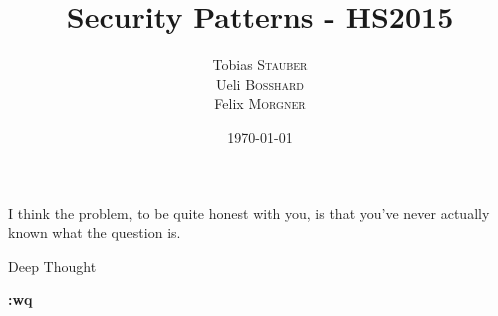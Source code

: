 \documentclass{report}
\title{Security Patterns - HS2015}
\author{Tobias \textsc{Stauber}\\Ueli \textsc{Bosshard}\\Felix \textsc{Morgner}}
\date{\today}
\newcommand{\inputChapter}[1]{}
\begin{document}
\maketitle
\clearpage
\vspace*{\fill}
  \epigraph{I think the problem, to be quite honest with you, is that you've never actually known what the question is.}{Deep Thought}
\vfill
\clearpage

\setcounter{tocdepth}{0}
\tableofcontents

\inputChapter{00-authorization}
\inputChapter{01-role_based_access_control}
\inputChapter{02-multi_level_security}
\inputChapter{03-reference_monitor}
\inputChapter{04-role_rights_definition}
\inputChapter{05-identification_and_authentication_intro}
\inputChapter{06-identification_and_authentication_requirements}
\inputChapter{07-access_control_requirements}
\inputChapter{08-single_access_point}
\inputChapter{09-check_point}
\inputChapter{10-security_session}
\inputChapter{11-full_access_with_errors}
\inputChapter{12-limited_access}
\inputChapter{13-packet_filter_firewall}
\inputChapter{14-proxy_based_firewall}
\inputChapter{15-stateful_firewall}
\inputChapter{16-information_obscurity}
\inputChapter{17-secure_channels}
\inputChapter{18-known_partners}
\inputChapter{19-demilitarized_zone}
\inputChapter{20-authenticator}
\inputChapter{21-controlled_process_creator}
\inputChapter{22-controlled_object_factory}
\inputChapter{23-controlled_object_monitor}
\inputChapter{24-controlled_virtual_address_space}
\inputChapter{25-execution_domain}
\inputChapter{26-controlled_execution_environment}
\inputChapter{27-file_authorization}
\inputChapter{28-protection_reverse_proxy}
\inputChapter{29-integration_reverse_proxy}

\clearpage
\vspace*{\fill}
\begin{center}
    { \huge \bfseries :wq }
\end{center}
\vfill
\clearpage
\end{document}
